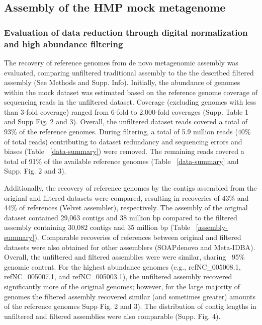 \documentclass[11pt]{article} %
\begin{document}
\subsection{Assembly of the HMP mock metagenome}

\subsubsection{Evaluation of data reduction through digital normalization 
and high abundance filtering}

The recovery of reference genomes from de novo metagenomic assembly
was evaluated, comparing unfiltered traditional assembly to the the
described filtered assembly (See Methods and Supp. Info). Initially,
the abundance of genomes within the mock dataset was estimated based
on the reference genome coverage of sequencing reads in the unfiltered
dataset.  Coverage (excluding genomes with less than 3-fold coverage)
ranged from 6-fold to 2,000-fold coverages (Supp. Table
1 and Supp Fig. 2 and 3).  Overall, the unfiltered dataset reads covered a
total of 93\% of the reference genomes.  During filtering, a total of
5.9 million reads (40\% of total reads) contributing to dataset
redundancy and sequencing errors and biases (Table ~\ref{data-summary}) 
were removed.  The remaining reads covered a total of 91\% of the available 
reference genomes (Table ~\ref{data-summary} and Supp. Fig. 2 and 3).

Additionally, the recovery of reference genomes by the contigs
assembled from the original and filtered datasets were compared,
resulting in recoveries of 43\% and 44\% of references (Velvet
assembler), respectively.  The assembly of the original dataset
contained 29,063 contigs and 38 million bp compared to the filtered
assembly containing 30,082 contigs and 35 million bp (Table
~\ref{assembly-summary}).  Comparable recoveries of references between
original and filtered datasets were also obtained for other assemblers
(SOAPdenovo and Meta-IDBA).  Overall, the unfiltered and filtered
assemblies were were similar, sharing ~95\% genomic content.  For the
highest abundance genomes (e.g., ref\textbar{}NC\_005008.1,
ref\textbar{}NC\_005007.1, and ref\textbar{}NC\_005003.1), the
unfiltered assembly recovered significantly more of the original
genomes; however, for the large majority of genomes the filtered
assembly recovered similar (and sometimes greater) amounts of the
reference genomes Supp Fig. 2 and 3).  The distribution of contig
lengths in unfiltered and filtered assemblies were also comparable
(Supp. Fig. 4).
\end{document}
